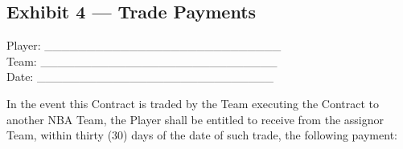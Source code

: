 \documentclass[
]{book}
\begin{document}
\newpage

\hypertarget{exhibit-4-trade-payments}{%
\subsection{Exhibit 4 --- Trade Payments}\label{exhibit-4-trade-payments}}

Player: \_\_\_\_\_\_\_\_\_\_\_\_\_\_\_\_\_\_\_\_\_\_\_\_\_\_\_\_\\
Team: \_\_\_\_\_\_\_\_\_\_\_\_\_\_\_\_\_\_\_\_\_\_\_\_\_\_\_\_\\
Date: \_\_\_\_\_\_\_\_\_\_\_\_\_\_\_\_\_\_\_\_\_\_\_\_\_\_\_\_

In the event this Contract is traded by the Team executing the Contract to another NBA Team, the Player shall be entitled to receive from the assignor Team, within thirty (30) days of the date of such trade, the following payment:
\end{document}
